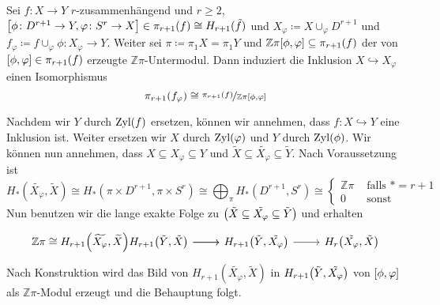 \begin{lemma}
	Sei $f \colon X \to Y$ $r$-zusammenhängend und $r \ge 2$, $\benbrace*{\phi \colon D^{r+1} \to Y, \varphi \colon S^{r} \to X} \in \pi_{r+1}(f) \cong H_{r+1}(\tilde{f})$ und $X_\varphi \coloneqq X \cup_{\varphi} D^{r+1}$ und $f_\varphi \coloneqq f \cup_\varphi \phi \colon X_\varphi \to Y$.
	Weiter sei $\pi \coloneqq \pi_1 X = \pi_1 Y$ und $\mathbb{Z}\pi \benbrace*{\phi,\varphi} \subseteq \pi_{r+1}(f)$ der von $\benbrace*{\phi,\varphi} \in \pi_{r+1}(f)$ erzeugte $\mathbb{Z}\pi$-Untermodul.
	Dann induziert die Inklusion $X \hookrightarrow X_\varphi$ einen Isomorphismus 
	\[
		\pi_{r+1}(f_\varphi) \cong \nicefrac{\pi_{r+1}(f)}{\mathbb{Z}\pi \benbrace*{\phi,\varphi}}
	\]
\end{lemma}
\begin{beweis}
	Nachdem wir $Y$ durch $\Zyl(f)$ ersetzen, können wir annehmen, dass $f \colon X \hookrightarrow Y$ eine Inklusion ist. 
	Weiter ersetzen wir $X$ durch $\Zyl(\varphi)$ und $Y$ durch $\Zyl(\phi)$.
	Wir können nun annehmen, dass $X \subseteq X_\varphi \subseteq Y$ und $\tilde{X} \subseteq \tilde{X_\varphi} \subseteq \tilde{Y}$.
	Nach Voraussetzung ist 
	\[
		H_*(\widetilde{X_\varphi},\widetilde{X}) \cong H_*(\pi \times D^{r+1}, \pi \times S^r) \cong \bigoplus_\pi H_*(D^{r+1},S^r) \cong \begin{cases}
			\mathbb{Z}\pi &\text{ falls }*=r+1\\
			0 &\text{ sonst}
		\end{cases}
	\]
	Nun benutzen wir die lange exakte Folge zu $\enbrace*{\tilde{X} \subseteq \tilde{X_\varphi} \subseteq \tilde{Y}}$ und erhalten
	\[
		\begin{tikzcd}
			\mathbb{Z}\pi \cong H_{r+1} \enbrace*{\widetilde{X_\varphi}, \widetilde{X}} \rar H_{r+1} \enbrace*{\tilde{Y},\tilde{X}} \rar & H_{r+1} \enbrace*{\tilde{Y},\tilde{X_\varphi}} \rar & H_{r} \enbrace*{\tilde{X_\varphi},\tilde{X}}
		\end{tikzcd}
	\]
	Nach Konstruktion wird das Bild von $H_{r+1}(\tilde{X_\varphi},\tilde{X})$ in $H_{r+1} \enbrace*{\tilde{Y},\tilde{X_\varphi}}$ von $\benbrace*{\phi,\varphi}$ als $\mathbb{Z}\pi$-Modul erzeugt und die Behauptung folgt.
\end{beweis}

